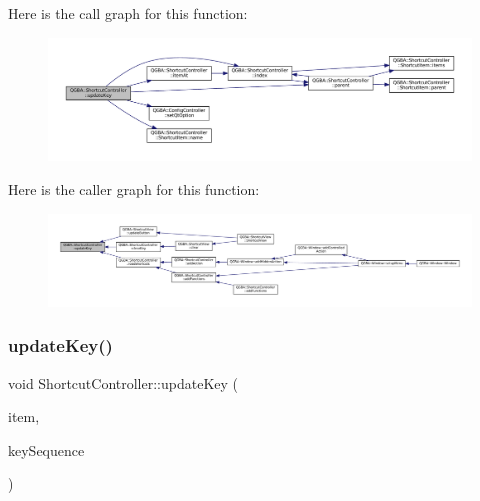 Here is the call graph for this function\+:
\nopagebreak
\begin{figure}[H]
\begin{center}
\leavevmode
\includegraphics[width=350pt]{class_q_g_b_a_1_1_shortcut_controller_a5a3035a01274244bff7fffe1a09aaf58_cgraph}
\end{center}
\end{figure}
Here is the caller graph for this function\+:
\nopagebreak
\begin{figure}[H]
\begin{center}
\leavevmode
\includegraphics[width=350pt]{class_q_g_b_a_1_1_shortcut_controller_a5a3035a01274244bff7fffe1a09aaf58_icgraph}
\end{center}
\end{figure}
\mbox{\label{class_q_g_b_a_1_1_shortcut_controller_a1a530e8a7c1c6bc5cab2db9c33a81763}} 
\subsubsection{\texorpdfstring{update\+Key()}{updateKey()}\hspace{0.1cm}{\footnotesize\ttfamily [2/2]}}
{\footnotesize\ttfamily void Shortcut\+Controller\+::update\+Key (\begin{DoxyParamCaption}\item[{\mbox{\hyperlink{class_q_g_b_a_1_1_shortcut_controller_1_1_shortcut_item}{Shortcut\+Item}} $\ast$}]{item,  }\item[{\mbox{\hyperlink{ioapi_8h_a787fa3cf048117ba7123753c1e74fcd6}{int}}}]{key\+Sequence }\end{DoxyParamCaption})\hspace{0.3cm}{\ttfamily [private]}}

